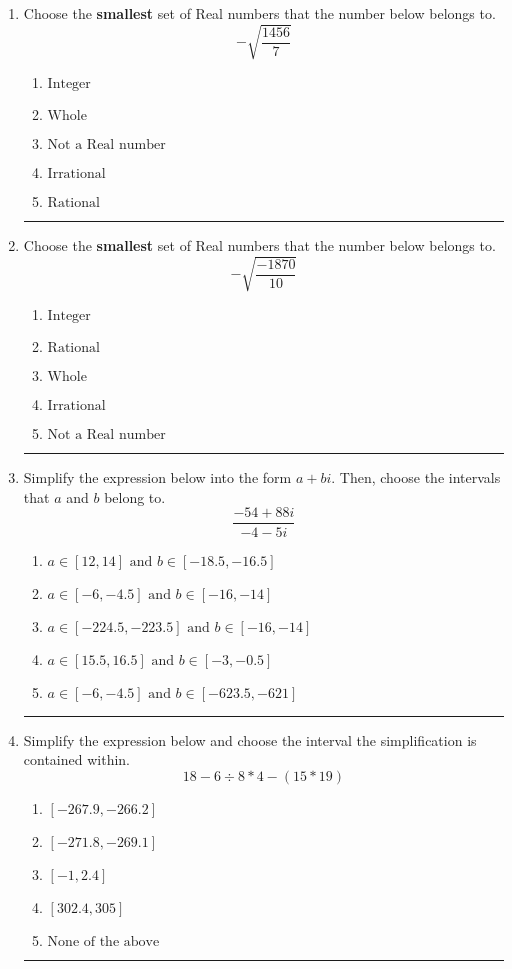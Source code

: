\documentclass[14pt]{extbook}
\newcommand{\litem}[1]{\item#1\hspace*{-1cm}\rule{\textwidth}{0.4pt}}
\begin{document}
\begin{enumerate}
{\begin{enumerate}[label=\Alph*.]
\end{enumerate} }
\litem{
Choose the \textbf{smallest} set of Real numbers that the number below belongs to.\[ -\sqrt{\frac{1456}{7}} \]\begin{enumerate}[label=\Alph*.]
\item \( \text{Integer} \)
\item \( \text{Whole} \)
\item \( \text{Not a Real number} \)
\item \( \text{Irrational} \)
\item \( \text{Rational} \)

\end{enumerate} }
\litem{
Choose the \textbf{smallest} set of Real numbers that the number below belongs to.\[ -\sqrt{\frac{-1870}{10}} \]\begin{enumerate}[label=\Alph*.]
\item \( \text{Integer} \)
\item \( \text{Rational} \)
\item \( \text{Whole} \)
\item \( \text{Irrational} \)
\item \( \text{Not a Real number} \)

\end{enumerate} }
\litem{
Simplify the expression below into the form $a+bi$. Then, choose the intervals that $a$ and $b$ belong to.\[ \frac{-54 + 88 i}{-4 - 5 i} \]\begin{enumerate}[label=\Alph*.]
\item \( a \in [12, 14] \text{ and } b \in [-18.5, -16.5] \)
\item \( a \in [-6, -4.5] \text{ and } b \in [-16, -14] \)
\item \( a \in [-224.5, -223.5] \text{ and } b \in [-16, -14] \)
\item \( a \in [15.5, 16.5] \text{ and } b \in [-3, -0.5] \)
\item \( a \in [-6, -4.5] \text{ and } b \in [-623.5, -621] \)

\end{enumerate} }
\litem{
Simplify the expression below and choose the interval the simplification is contained within.\[ 18 - 6 \div 8 * 4 - (15 * 19) \]\begin{enumerate}[label=\Alph*.]
\item \( [-267.9, -266.2] \)
\item \( [-271.8, -269.1] \)
\item \( [-1, 2.4] \)
\item \( [302.4, 305] \)
\item \( \text{None of the above} \)


\end{enumerate}}
\end{enumerate}
\end{document}
